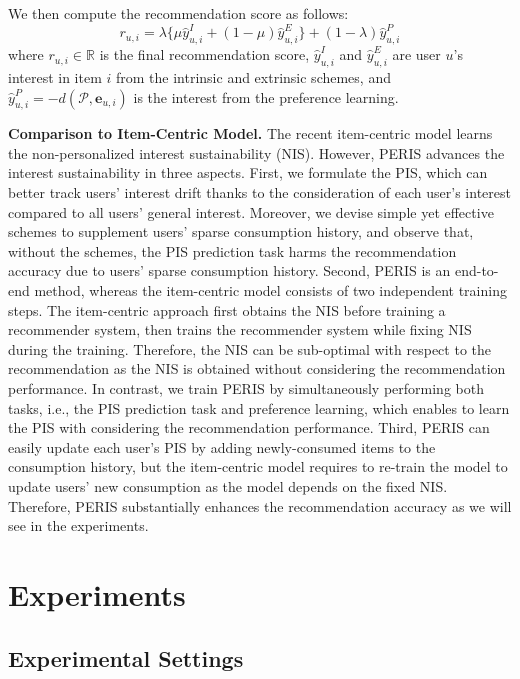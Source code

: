\documentclass[sigconf]{acmart}
\newcommand{\MD}{{\small\textsf{PERIS}}}
\begin{document}
We then compute the recommendation score as follows:
\begin{equation}
    r_{u,i} = \lambda \bigl \{\mu \hat{y}_{u,i}^I + (1-\mu)\hat{y}_{u,i}^E\bigr\} + (1-\lambda) \hat{y}_{u,i}^P
    \label{eqn:score}
\end{equation}
where $r_{u,i}\in \mathbb{R}$ is the final recommendation score, $\hat{y}_{u,i}^I$ and $\hat{y}_{u,i}^E$ are user $u$'s interest in item $i$ from the intrinsic and extrinsic schemes, and $\hat{y}_{u,i}^P = -d(\mathcal{P}, \textbf{e}_{u,i})$ is the interest from the preference learning.  

\smallskip
\noindent\textbf{Comparison to Item-Centric Model.} The recent item-centric model \cite{hyun2020interest} learns the non-personalized interest sustainability (NIS). However, \MD{} advances the interest sustainability in three aspects. 
First, we formulate the PIS, which can better track users' interest drift thanks to the consideration of each user's interest compared to all users' general interest. Moreover, we devise simple yet effective schemes to supplement users' sparse consumption history, and observe that, without the schemes, the PIS prediction task harms the recommendation accuracy due to users' sparse consumption history.
Second, \MD{} is an end-to-end method, whereas the item-centric model consists of two independent training steps. The item-centric approach first obtains the NIS before training a recommender system, then trains the recommender system while fixing NIS during the training. Therefore, the NIS can be sub-optimal with respect to the recommendation as the NIS is obtained without considering the recommendation performance. In contrast, we train \MD{} by simultaneously performing both tasks, i.e., the PIS prediction task and preference learning, which enables to learn  the PIS with considering the recommendation performance.
Third, \MD{} can easily update each user's PIS by adding newly-consumed items to the consumption history, but the item-centric model requires to re-train the model to update users' new consumption as the model depends on the fixed NIS. Therefore, \MD{} substantially enhances the recommendation accuracy as we will see in the experiments.


\section{Experiments}

\subsection{Experimental Settings}
\end{document}
